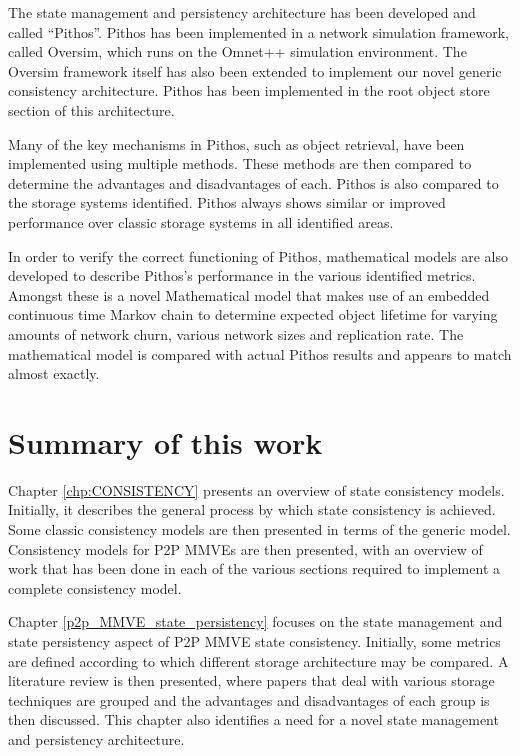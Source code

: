 The state management and persistency architecture has been developed and called ``Pithos''. Pithos has been implemented in a network simulation framework, called Oversim, which runs on the Omnet++ simulation environment. The Oversim framework itself has also been extended to implement our novel generic consistency architecture. Pithos has been implemented in the root object store section of this architecture.

Many of the key mechanisms in Pithos, such as object retrieval, have been implemented using multiple methods. These methods are then compared to determine the advantages and disadvantages of each. Pithos is also compared to the storage systems identified. Pithos always shows similar or improved performance over classic storage systems in all identified areas.

In order to verify the correct functioning of Pithos, mathematical models are also developed to describe Pithos's performance in the various identified metrics. Amongst these is a novel Mathematical model that makes use of an embedded continuous time Markov chain to determine expected object lifetime for varying amounts of network churn, various network sizes and replication rate. The mathematical model is compared with actual Pithos results and appears to match almost exactly.

\section{Summary of this work}

Chapter \ref{chp:CONSISTENCY} presents an overview of state consistency models. Initially, it describes the general process by which state consistency is achieved. Some classic consistency models are then presented in terms of the generic model. Consistency models for P2P MMVEs are then presented, with an overview of work that has been done in each of the various sections required to implement a complete consistency model.

Chapter \ref{p2p_MMVE_state_persistency} focuses on the state management and state persistency aspect of P2P MMVE state consistency. Initially, some metrics are defined according to which different storage architecture may be compared. A literature review is then presented, where papers that deal with various storage techniques are grouped and the advantages and disadvantages of each group is then discussed. This chapter also identifies a need for a novel state management and persistency architecture.

